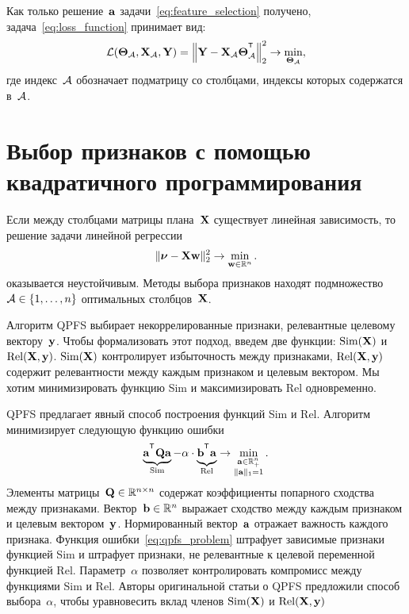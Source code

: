 Как только решение~$\mathbf{a}$ задачи~\eqref{eq:feature_selection} получено, задача~\eqref{eq:loss_function} принимает вид:
\begin{equation*}
\mathcal{L}(\bTheta_{\cA}, \bX_{\cA}, \bY) = {\left\| \mathbf{Y} - \bX_{\cA}\bTheta^{\T}_{\cA} \right\| }_2^2 \rightarrow\min_{\bTheta_{\cA}},
\end{equation*}
где индекс~$\mathcal{A}$ обозначает подматрицу со столбцами, индексы которых содержатся в~$\mathcal{A}$.

\section{Выбор признаков с помощью квадратичного программирования}

Если между столбцами матрицы плана~$\mathbf{X}$ существует линейная зависимость, то решение задачи линейной регрессии
\begin{equation}
\| \boldsymbol{\nu} - \mathbf{X} \mathbf{w}\|_2^2 \rightarrow\min_{\mathbf{w} \in \mathbb{R}^{n}}.
\label{eq:linear_regression}
\end{equation}
оказывается неустойчивым. 
Методы выбора признаков находят подмножество~$ \mathcal{A} \in \{1, \dots, n\}$ оптимальных столбцов~$\mathbf{X}$. 

Алгоритм QPFS выбирает некоррелированные признаки, релевантные целевому вектору~$\mathbf{y}$.
Чтобы формализовать этот подход, введем две функции: $\text{Sim}(\mathbf{X})$ и $\text{Rel}(\mathbf{X}, \mathbf{y})$. 
$\text{Sim}(\mathbf{X})$ контролирует избыточность между признаками, $\text{Rel}(\mathbf{X}, \mathbf{y})$ содержит релевантности между каждым признаком и целевым вектором. 
Мы хотим минимизировать функцию Sim и максимизировать Rel одновременно.

QPFS предлагает явный способ построения функций Sim и Rel. 
Алгоритм минимизирует следующую функцию ошибки
\begin{equation}
\underbrace{\ba^{\T} \bQ \ba}_{\text{Sim}} - \alpha \cdot \underbrace{\vphantom{()} \mathbf{b}^{\T} \ba}_{\text{Rel}} \rightarrow \min_{\substack{\ba \in \bbR^n_+ \\ \|\ba\|_1=1}}.
\label{eq:qpfs_problem}
\end{equation}
Элементы матрицы~$\mathbf{Q} \in \mathbb{R}^{n \times n}$ содержат коэффициенты попарного сходства между признаками. 
Вектор~$\mathbf{b} \in \mathbb{R}^n$ выражает сходство между каждым признаком и целевым вектором~$\mathbf{y}$.
Нормированный вектор~$\mathbf{a}$ отражает важность каждого признака. 
Функция ошибки~\eqref{eq:qpfs_problem} штрафует зависимые признаки функцией Sim и штрафует признаки, не релевантные к целевой переменной функцией Rel. 
Параметр~$\alpha$ позволяет контролировать компромисс между функциями Sim и Rel.
Авторы оригинальной статьи о QPFS предложили способ выбора~$\alpha$, чтобы уравновесить вклад членов $\text{Sim}(\mathbf{X})$ и $\text{Rel}(\mathbf{X}, \mathbf{y})$

